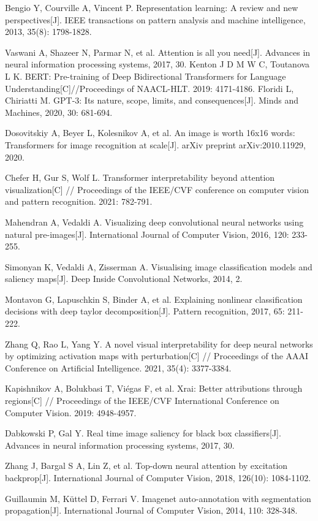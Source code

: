 \begin{thebibliography}{200}
Bengio Y, Courville A, Vincent P. Representation learning: A review and new perspectives[J]. IEEE transactions on pattern analysis and machine intelligence, 2013, 35(8): 1798-1828.

Vaswani A, Shazeer N, Parmar N, et al. Attention is all you need[J]. Advances in neural information processing systems, 2017, 30.
Kenton J D M W C, Toutanova L K. BERT: Pre-training of Deep Bidirectional Transformers for Language Understanding[C]//Proceedings of NAACL-HLT. 2019: 4171-4186.
Floridi L, Chiriatti M. GPT-3: Its nature, scope, limits, and consequences[J]. Minds and Machines, 2020, 30: 681-694.

Dosovitskiy A, Beyer L, Kolesnikov A, et al. An image is worth 16x16 words: Transformers for image recognition at scale[J]. arXiv preprint arXiv:2010.11929, 2020.

Chefer H, Gur S, Wolf L. Transformer interpretability beyond attention visualization[C] // Proceedings of the IEEE/CVF conference on computer vision and pattern recognition. 2021: 782-791.

Mahendran A, Vedaldi A. Visualizing deep convolutional neural networks using natural pre-images[J]. International Journal of Computer Vision, 2016, 120: 233-255.

Simonyan K, Vedaldi A, Zisserman A. Visualising image classification models and saliency maps[J]. Deep Inside Convolutional Networks, 2014, 2.



Montavon G, Lapuschkin S, Binder A, et al. Explaining nonlinear classification decisions with deep taylor decomposition[J]. Pattern recognition, 2017, 65: 211-222.


Zhang Q, Rao L, Yang Y. A novel visual interpretability for deep neural networks by optimizing activation maps with perturbation[C] // Proceedings of the AAAI Conference on Artificial Intelligence. 2021, 35(4): 3377-3384.

Kapishnikov A, Bolukbasi T, Viégas F, et al. Xrai: Better attributions through regions[C] // Proceedings of the IEEE/CVF International Conference on Computer Vision. 2019: 4948-4957.

Dabkowski P, Gal Y. Real time image saliency for black box classifiers[J]. Advances in neural information processing systems, 2017, 30.

Zhang J, Bargal S A, Lin Z, et al. Top-down neural attention by excitation backprop[J]. International Journal of Computer Vision, 2018, 126(10): 1084-1102.

Guillaumin M, Küttel D, Ferrari V. Imagenet auto-annotation with segmentation propagation[J]. International Journal of Computer Vision, 2014, 110: 328-348.



\end{thebibliography}

